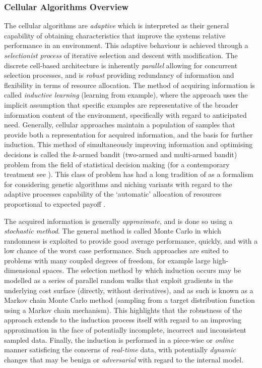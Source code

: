 \subsubsection{Cellular Algorithms Overview}
The cellular algorithms are \emph{adaptive} which is interpreted as their general capability of obtaining characteristics that improve the systems relative performance in an environment. This adaptive behaviour is achieved through a \emph{selectionist process} of iterative selection and descent with modification. The discrete cell-based architecture is inherently \emph{parallel} allowing for concurrent selection processes, and is \emph{robust} providing redundancy of information and flexibility in terms of resource allocation. The method of acquiring information is called \emph{inductive learning} (learning from example), where the approach uses the implicit assumption that specific examples are representative of the broader information content of the environment, specifically with regard to anticipated need. Generally, cellular approaches maintain a population of samples that provide both a representation for acquired information, and the basis for further induction.
This method of simultaneously improving information and optimising decisions is called the $k$-armed bandit (two-armed and multi-armed bandit) problem from the field of statistical decision making \cite{Robbins1952} (for a contemporary treatment see \cite{Bergemann2006}). This class of problem has had a long tradition of as a formalism for considering genetic algorithms and niching variants with regard to the adaptive processes capability of the `automatic' allocation of resources proportional to expected payoff \cite{Goldberg1989a}.

The acquired information is generally \emph{approximate}, and is done so using a \emph{stochastic method}. The general method is called Monte Carlo in which randomness is exploited to provide good average performance, quickly, and with a low chance of the worst case performance. Such approaches are suited to problems with many coupled degrees of freedom, for example large high-dimensional spaces. The selection method by which induction occurs may be modelled as a series of parallel random walks that exploit gradients in the underlying cost surface (directly, without derivatives), and as such is known as a Markov chain Monte Carlo method \cite{Andrieu2003, Clark2005} (sampling from a target distribution function using a Markov chain mechanism). This highlights that the robustness of the approach extends to the induction process itself with regard to an improving approximation in the face of potentially incomplete, incorrect and inconsistent sampled data. 
Finally, the induction is performed in a piece-wise or \emph{online} manner satisficing the concerns of \emph{real-time} data, with potentially \emph{dynamic} changes that may be benign or \emph{adversarial} with regard to the internal model.

